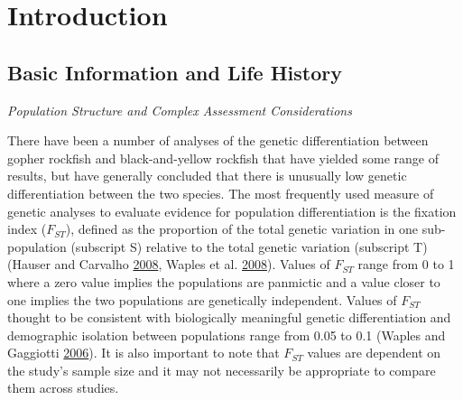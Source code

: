 \documentclass[12pt,]{article}
\begin{document}
\newpage

\renewcommand{\thefigure}{\arabic{figure}}
\renewcommand{\thetable}{\arabic{table}}

\setcounter{figure}{0} \setcounter{table}{0}


\section{Introduction}\label{introduction}

\subsection{Basic Information and Life
History}\label{basic-information-and-life-history}

\emph{Population Structure and Complex Assessment Considerations}

There have been a number of analyses of the genetic differentiation
between gopher rockfish and black-and-yellow rockfish that have yielded
some range of results, but have generally concluded that there is
unusually low genetic differentiation between the two species. The most
frequently used measure of genetic analyses to evaluate evidence for
population differentiation is the fixation index (\(F_{ST}\)), defined
as the proportion of the total genetic variation in one sub-population
(subscript S) relative to the total genetic variation (subscript T)
(Hauser and Carvalho \protect\hyperlink{ref-Hauser2008}{2008}, Waples et
al. \protect\hyperlink{ref-Waples2008}{2008}). Values of \(F_{ST}\)
range from 0 to 1 where a zero value implies the populations are
panmictic and a value closer to one implies the two populations are
genetically independent. Values of \(F_{ST}\) thought to be consistent
with biologically meaningful genetic differentiation and demographic
isolation between populations range from 0.05 to 0.1 (Waples and
Gaggiotti \protect\hyperlink{ref-Waples2006}{2006}). It is also
important to note that \(F_{ST}\) values are dependent on the study's
sample size and it may not necessarily be appropriate to compare them
across studies.
\end{document}
